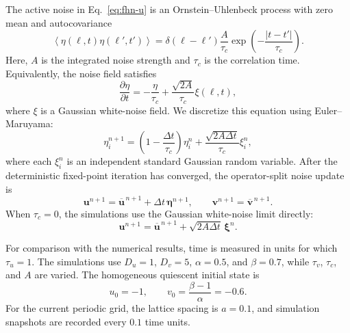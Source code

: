 The active noise in Eq.~\eqref{eq:fhn-u} is an
Ornstein--Uhlenbeck process with zero mean and autocovariance
\begin{equation}
  \left\langle
    \eta(\ell,t)\eta(\ell',t')
  \right\rangle
  =
  \delta(\ell-\ell')\frac{A}{\tau_c}
  \exp\left(-\frac{|t-t'|}{\tau_c}\right).
  \label{eq:noise-covariance}
\end{equation}
Here, \(A\) is the integrated noise strength and \(\tau_c\) is the
correlation time.  Equivalently, the noise field satisfies
\begin{equation}
  \frac{\partial\eta}{\partial t}
    =-\frac{\eta}{\tau_c}
      +\frac{\sqrt{2A}}{\tau_c}\xi(\ell,t),
  \label{eq:ou-equation}
\end{equation}
where \(\xi\) is a Gaussian white-noise field.  We discretize this equation
using Euler--Maruyama:
\begin{equation}
  \eta_i^{n+1}
    =\left(1-\frac{\Delta t}{\tau_c}\right)\eta_i^n
      +\frac{\sqrt{2A\Delta t}}{\tau_c}\xi_i^n,
  \label{eq:ou-update}
\end{equation}
where each \(\xi_i^n\) is an independent standard Gaussian random
variable.  After the deterministic fixed-point iteration has converged,
the operator-split noise update is
\begin{equation}
  \boldsymbol u^{n+1}
    =\overline{\boldsymbol u}^{\,n+1}
      +\Delta t\,\boldsymbol\eta^{n+1},
  \qquad
  \boldsymbol v^{n+1}
    =\overline{\boldsymbol v}^{\,n+1}.
  \label{eq:split-noise-update}
\end{equation}
When \(\tau_c=0\), the simulations use the Gaussian white-noise limit
directly:
\begin{equation}
  \boldsymbol u^{n+1}
    =\overline{\boldsymbol u}^{\,n+1}
      +\sqrt{2A\Delta t}\,\boldsymbol\xi^n.
  \label{eq:white-noise-update}
\end{equation}

For comparison with the numerical results, time is measured in units for
which \(\tau_u=1\).  The simulations use
\(D_u=1\), \(D_v=5\), \(\alpha=0.5\), and \(\beta=0.7\), while
\(\tau_v\), \(\tau_c\), and \(A\) are varied.  The homogeneous quiescent
initial state is
\begin{equation}
  u_0=-1,
  \qquad
  v_0=\frac{\beta-1}{\alpha}=-0.6.
  \label{eq:quiescent-state}
\end{equation}
For the current periodic grid, the lattice spacing is \(a=0.1\), and
simulation snapshots are recorded every \(0.1\) time units.
